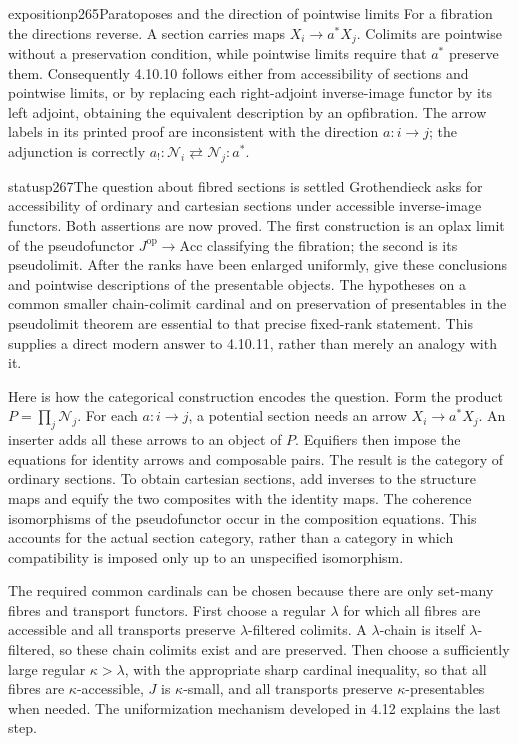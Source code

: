 \begin{dcomment}{exposition}{p265}{Paratoposes and the direction of pointwise limits}
For a fibration the directions reverse. A section carries maps $X_i\to a^*X_j$. Colimits are pointwise without a preservation condition, while pointwise limits require that $a^*$ preserve them. Consequently 4.10.10 follows either from accessibility of sections and pointwise limits, or by replacing each right-adjoint inverse-image functor by its left adjoint, obtaining the equivalent description by an opfibration. The arrow labels in its printed proof are inconsistent with the direction $a:i\to j$; the adjunction is correctly $a_!:\mathcal N_i\rightleftarrows\mathcal N_j:a^*$.
\end{dcomment}

\begin{dcomment}{status}{p267}{The question about fibred sections is settled}
Grothendieck asks for accessibility of ordinary and cartesian sections under accessible inverse-image functors. Both assertions are now proved. The first construction is an oplax limit of the pseudofunctor $J^{\mathrm{op}}\to\mathrm{Acc}$ classifying the fibration; the second is its pseudolimit. After the ranks have been enlarged uniformly, \citet[Theorems~8.1, 8.3 and Corollary~9.2]{Positselski2024Limits} give these conclusions and pointwise descriptions of the presentable objects. The hypotheses on a common smaller chain-colimit cardinal and on preservation of presentables in the pseudolimit theorem are essential to that precise fixed-rank statement. This supplies a direct modern answer to 4.10.11, rather than merely an analogy with it.

Here is how the categorical construction encodes the question. Form the product $P=\prod_j\mathcal N_j$. For each $a:i\to j$, a potential section needs an arrow $X_i\to a^*X_j$. An inserter adds all these arrows to an object of $P$. Equifiers then impose the equations for identity arrows and composable pairs. The result is the category of ordinary sections. To obtain cartesian sections, add inverses to the structure maps and equify the two composites with the identity maps. The coherence isomorphisms of the pseudofunctor occur in the composition equations. This accounts for the actual section category, rather than a category in which compatibility is imposed only up to an unspecified isomorphism.

The required common cardinals can be chosen because there are only set-many fibres and transport functors. First choose a regular $\lambda$ for which all fibres are accessible and all transports preserve $\lambda$-filtered colimits. A $\lambda$-chain is itself $\lambda$-filtered, so these chain colimits exist and are preserved. Then choose a sufficiently large regular $\kappa>\lambda$, with the appropriate sharp cardinal inequality, so that all fibres are $\kappa$-accessible, $J$ is $\kappa$-small, and all transports preserve $\kappa$-presentables when needed. The uniformization mechanism developed in 4.12 explains the last step.


\end{dcomment}
